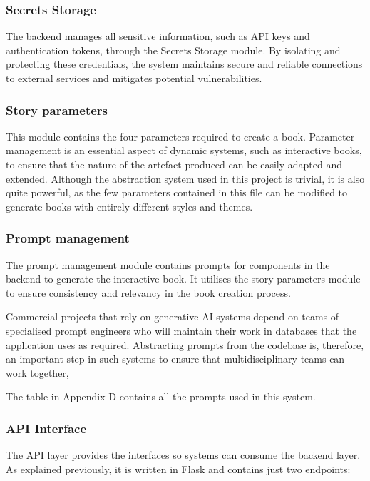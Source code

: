 \documentclass[conference]{IEEEtran}
\begin{document}
	\subsubsection{Secrets Storage}
	The backend manages all sensitive information, such as API keys and authentication tokens, through the Secrets Storage module. By isolating and protecting these credentials, the system maintains secure and reliable connections to external services and mitigates potential vulnerabilities. 
	
	\subsubsection{Story parameters}
	This module contains the four parameters required to create a book. Parameter management is an essential aspect of dynamic systems, such as interactive books, to ensure that the nature of the artefact produced can be easily adapted and extended. Although the abstraction system used in this project is trivial, it is also quite powerful, as the few parameters contained in this file can be modified to generate books with entirely different styles and themes.
		
	\subsubsection{Prompt management}
	The prompt management module contains prompts for components in the backend to generate the interactive book. It utilises the story parameters module to ensure consistency and relevancy in the book creation process. 
	
	Commercial projects that rely on generative AI systems depend on teams of specialised prompt engineers who will maintain their work in databases that the application uses as required. Abstracting prompts from the codebase is, therefore, an important step in such systems to ensure that multidisciplinary teams can work together,
	
	The table in Appendix D contains all the prompts used in this system.
		
	\subsubsection{API Interface}
	
	The API layer provides the interfaces so systems can consume the backend layer. As explained previously, it is written in Flask and contains just two endpoints:
	
\end{document}
